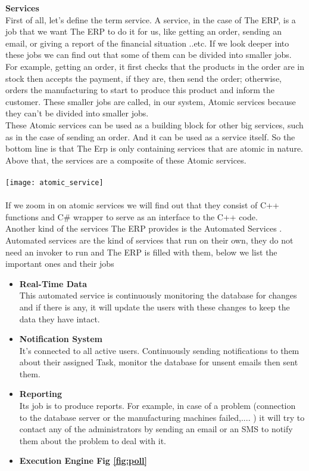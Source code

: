 \begin{adjustwidth}{2cm}{}
    \textbf{Services}\\
        First of all, let’s define the term service. A service, in the case of The ERP, is a job that we
want The ERP to do it for us, like getting an order, sending an email, or giving a report of the
financial situation ..etc.
If we look deeper into these jobs we can find out that some of them can be divided into
smaller jobs. For example, getting an order, it first checks that the products in the order are in
stock then accepts the payment, if they are, then send the order; otherwise, orders the
manufacturing to start to produce this product and inform the customer.
These smaller jobs are called, in our system, Atomic services because they can’t be divided
into smaller jobs.\\
These Atomic services can be used as a building block for other big services, such as in the
case of sending an order. And it can be used as a service itself. So the bottom line is that The
Erp is only containing services that are atomic in nature.
Above that, the services are a composite of these Atomic services.\\\\
\texttt{[image: atomic\_service]}\\\\
If we zoom in on atomic services we will find out that they consist of C++ functions and C\#
wrapper to serve as an interface to the C++ code.\\
Another kind of the services The ERP provides is the Automated Services .
Automated services are the kind of services that run on their own, they do not need an invoker
to run and The ERP is filled with them, below we list the important ones and their jobs\\
\newpage
\begin{itemize}
    \item \textbf{Real-Time Data}\\ This automated service is continuously monitoring the database for changes and if there is
    any, it will update the users with these changes to keep the data they have intact.\\
    \item \textbf{Notification System}\\ It’s connected to all active users. Continuously sending notifications to them about their
    assigned Task, monitor the database for unsent emails then sent them.\\
    \item \textbf{Reporting}\\ Its job is to produce reports. For example, in case of a problem (connection to the database
    server or the manufacturing machines failed,.... ) it will try to contact any of the
    administrators by sending an email or an SMS to notify them about the problem to deal with
    it.\\
    \item \textbf{Execution Engine Fig \ref{fig:poll}}\\
    

\end{itemize}
\end{adjustwidth}
